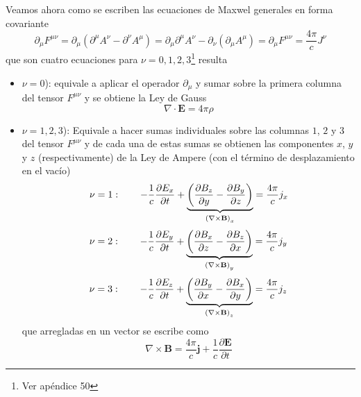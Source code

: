 \indent Veamos ahora como se escriben las ecuaciones de Maxwel generales en forma covariante
\begin{equation*}
    \partial_{\mu}F^{\mu\nu} = 
    \partial_{\mu}
    \left(
        \partial^{\mu}A^{\nu} - \partial^{\nu}A^{\mu}
    \right)
    = \partial_{\mu}\partial^{\mu}A^{\nu} 
    - \partial_{\nu}(\partial_{\mu}A^{\mu})
    = \partial_{\mu}F^{\mu\nu} = \frac{4\pi}{c}J^{\nu}
\end{equation*}
que son cuatro ecuaciones para $\nu = 0,1,2,3$\footnote{Ver apéndice 50} resulta
\begin{itemize}
    \item $\nu = 0$): equivale a aplicar el operador $\partial_{\mu}$ y sumar sobre la primera columna del tensor $F^{\mu\nu}$ y se obtiene la Ley de Gauss
    \begin{equation*}
        \nabla \cdot \textbf{E} = 4\pi \rho
    \end{equation*}
    
    \item $\nu = 1,2,3$): Equivale a hacer sumas individuales sobre las columnas $1$, $2$ y $3$ del tensor $F^{\mu\nu}$ y de cada una de estas sumas se obtienen las componentes $x$, $y$ y $z$ (respectivamente) de la Ley de Ampere (con el término de desplazamiento en el vacío)
    \begin{equation*}
        \nu = 1:
        \quad
        \quad
        - \frac{1}{c}\frac{\partial E_{x}}{\partial t} 
        + 
        \underbrace%
        {%
            \left(
                \frac{\partial B_{z}}{\partial y} 
                - \frac{\partial B_{y}}{\partial z}
            \right)
        }_{\left(
            \nabla \times \textbf{B}
        \right)_{x} }
        = \frac{4\pi}{c}j_{x}
    \end{equation*}
    \begin{equation*}
        \nu = 2:
        \quad
        \quad
        - \frac{1}{c}\frac{\partial E_{y}}{\partial t} 
        + 
        \underbrace%
        {%
            \left(
                \frac{\partial B_{x}}{\partial z} 
                - \frac{\partial B_{z}}{\partial x}
            \right)
        }_{\left(
            \nabla \times \textbf{B}
        \right)_{y}}
        = \frac{4\pi}{c}j_{y}
    \end{equation*}
    \begin{equation*}
        \nu = 3:
        \quad
        \quad
        - \frac{1}{c}\frac{\partial E_{z}}{\partial t} 
        + 
        \underbrace%
        {%
            \left(
                \frac{\partial B_{y}}{\partial x} 
                - \frac{\partial B_{x}}{\partial y}
            \right)
        }_{\left(
            \nabla \times \textbf{B}
        \right)_{z}}
        = \frac{4\pi}{c}j_{z}
    \end{equation*}
    que arregladas en un vector se escribe como
    \begin{equation*}
        \nabla \times \textbf{B} =
        \frac{4\pi}{c}\textbf{j} + 
        \frac{1}{c}\frac{\partial \textbf{E}}{\partial t}
    \end{equation*}
\end{itemize}
